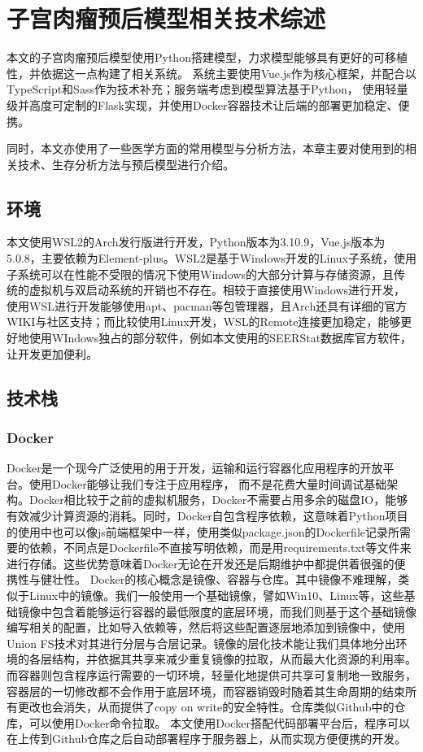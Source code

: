 \chapter{子宫肉瘤预后模型相关技术综述}
\label{chap:env} 

本文的子宫肉瘤预后模型使用Python搭建模型，力求模型能够具有更好的可移植性，并依据这一点构建了相关系统。
系统主要使用Vue.js作为核心框架，并配合以TypeScript和Sass作为技术补充；服务端考虑到模型算法基于Python，
使用轻量级并高度可定制的Flask实现，并使用Docker容器技术让后端的部署更加稳定、便携。

同时，本文亦使用了一些医学方面的常用模型与分析方法，本章主要对使用到的相关技术、生存分析方法与预后模型进行介绍。

\section{环境}

本文使用WSL2的Arch发行版进行开发，Python版本为3.10.9，Vue.js版本为5.0.8，主要依赖为Element-plus。WSL2是基于Windows开发的Linux子系统，使用子系统可以在性能不受限的情况下使用Windows的大部分计算与存储资源，且传统的虚拟机与双启动系统的开销也不存在。相较于直接使用Windows进行开发，使用WSL进行开发能够使用apt、pacman等包管理器，且Arch还具有详细的官方WIKI与社区支持；而比较使用Linux开发，WSL的Remote连接更加稳定，能够更好地使用WIndows独占的部分软件，例如本文使用的SEERStat数据库官方软件，让开发更加便利。

\section{技术栈}

\subsection{Docker}

Docker是一个现今广泛使用的用于开发，运输和运行容器化应用程序的开放平台。使用Docker能够让我们专注于应用程序，
而不是花费大量时间调试基础架构。Docker相比较于之前的虚拟机服务，Docker不需要占用多余的磁盘IO，能够有效减少计算资源的消耗。同时，Docker自包含程序依赖，这意味着Python项目的使用中也可以像js前端框架中一样，使用类似package.json的Dockerfile记录所需要的依赖，不同点是Dockerfile不直接写明依赖，而是用requirements.txt等文件来进行存储。这些优势意味着Docker无论在开发还是后期维护中都提供着很强的便携性与健壮性。
Docker的核心概念是镜像、容器与仓库。其中镜像不难理解，类似于Linux中的镜像。我们一般使用一个基础镜像，譬如Win10、Linux等，这些基础镜像中包含着能够运行容器的最低限度的底层环境，而我们则基于这个基础镜像编写相关的配置，比如导入依赖等，然后将这些配置逐层地添加到镜像中，使用Union FS技术对其进行分层与合层记录。镜像的层化技术能让我们具体地分出环境的各层结构，并依据其共享来减少重复镜像的拉取，从而最大化资源的利用率。而容器则包含程序运行需要的一切环境，轻量化地提供可共享可复制地一致服务，容器层的一切修改都不会作用于底层环境，而容器销毁时随着其生命周期的结束所有更改也会消失，从而提供了copy on write的安全特性。仓库类似Github中的仓库，可以使用Docker命令拉取。
本文使用Docker搭配代码部署平台后，程序可以在上传到Github仓库之后自动部署程序于服务器上，从而实现方便便携的开发。


